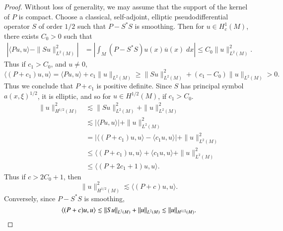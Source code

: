 \begin{proof}
    Without loss of generality, we may assume that the support of the kernel of $P$ is compact. Choose a classical, self-adjoint, elliptic pseudodifferential operator $S$ of order $1/2$ such that $P - S^* S$ is smoothing. Then for $u \in H^1_c(M)$, there exists $C_0 > 0$ such that
    \begin{align*}
        \left| \langle Pu, u \rangle - \| Su \|_{L^2(M)}^2 \right| &= \left| \int_M (P - S^* S) u(x) \overline{u}(x)\; dx \right| \leq C_0 \| u \|_{L^2(M)}^2.
    \end{align*}
    Thus if $c_1 > C_0$, and $u \neq 0$,
    \[ \langle (P + c_1) u, u \rangle = \langle Pu, u \rangle + c_1 \| u \|_{L^2(M)} \geq \| Su \|_{L^2(M)}^2 + (c_1 - C_0) \| u \|_{L^2(M)} > 0. \]
    Thus we conclude that $P + c_1$ is positive definite. Since $S$ has principal symbol $a(x,\xi)^{1/2}$, it is elliptic, and so for $u \in H^{1/2}(M)$, if $c_1 > C_0$.
    \begin{align*}
        \| u \|_{H^{1/2}(M)}^2 &\lesssim \| Su \|_{L^2(M)}^2 + \| u \|_{L^2(M)}^2\\
        &\lesssim \left| \langle Pu, u \rangle \right| + \| u \|_{L^2(M)}^2\\
        &= |\langle (P + c_1) u, u \rangle - \langle c_1 u, u \rangle | + \| u \|_{L^2(M)}^2\\
        &\leq \langle (P + c_1) u, u \rangle + \langle c_1 u, u \rangle + \| u \|_{L^2(M)}^2\\
        &\leq \langle (P + 2c_1 + 1) u , u \rangle.
    \end{align*}
    Thus if $c > 2C_0 + 1$, then
    \[ \| u \|_{H^{1/2}(M)}^2 \lesssim \langle (P + c) u, u \rangle. \]
    Conversely, since $P - S^* S$ is smoothing,
    \[ \langle (P + c) u, u \rangle \lesssim \| Su \|_{L^2(M)} + \| u \|_{L^2(M)} \lesssim \| u \|_{H^{1/2}(M)}. \qedhere \]
\end{proof}

